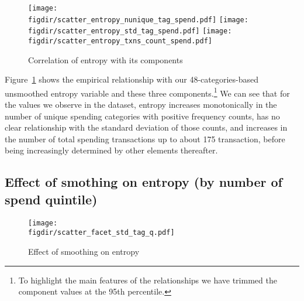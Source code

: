 \begin{figure}[ht]
    \centering 
    \caption{Correlation of entropy with its components}
    \label{fig:entropy_components}
    \texttt{[image: \\figdir/scatter\_entropy\_nunique\_tag\_spend.pdf]}
    \texttt{[image: \\figdir/scatter\_entropy\_std\_tag\_spend.pdf]}
    \texttt{[image: \\figdir/scatter\_entropy\_txns\_count\_spend.pdf]}
\end{figure}

Figure~\ref{fig:entropy_components} shows the empirical relationship with our
48-categories-based unsmoothed entropy variable and these three
components.\footnote{To highlight the main features of the relationships we
have trimmed the component values at the 95th percentile.} We can see that for
the values we observe in the dataset, entropy increases monotonically in the
number of unique spending categories with positive frequency counts, has no
clear relationship with the standard deviation of those counts, and increases
in the number of total spending transactions up to about 175 transaction,
before being increasingly determined by other elements thereafter.


\subsection{Effect of smothing on entropy (by number of spend quintile)}%
\label{sub:effect_of_smothing_on_entropy_by_number_of_spend_quintile_}

\begin{figure}[ht]
    \centering 
    \caption{Effect of smoothing on entropy}
    \label{fig:scatter_facets_txns_count_spend_q}
    \texttt{[image: \\figdir/scatter\_facet\_std\_tag\_q.pdf]}
\end{figure}

